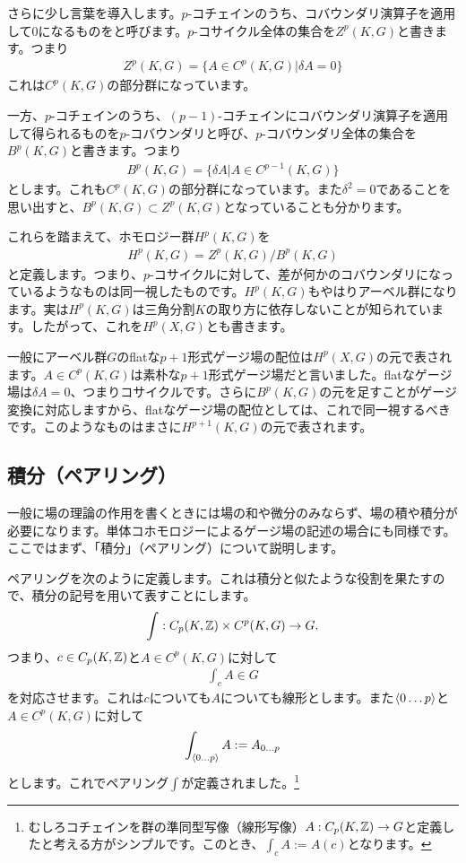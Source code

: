 \documentclass[generalized_symmetry.tex]{subfiles}
\begin{document}
さらに少し言葉を導入します。$p$-コチェインのうち、コバウンダリ演算子を適用して$0$になるものをと呼びます。$p$-コサイクル全体の集合を$Z^p(K,G)$と書きます。つまり
\begin{align}
    Z^p(K,G) = \{A\in C^p(K,G) | \delta A = 0\}
\end{align}
これは$C^p(K,G)$の部分群になっています。

一方、$p$-コチェインのうち、$(p-1)$-コチェインにコバウンダリ演算子を適用して得られるものを$p$-コバウンダリと呼び、$p$-コバウンダリ全体の集合を$B^p(K,G)$と書きます。つまり
\begin{align}
    B^p(K,G) = \{\delta A | A\in C^{p-1}(K,G)\}
\end{align}
とします。これも$C^p(K,G)$の部分群になっています。また$\delta^2=0$であることを思い出すと、$B^p(K,G)\subset Z^p(K,G)$となっていることも分かります。

これらを踏まえて、ホモロジー群$H^p(K,G)$を
\begin{align}
    H^p(K,G) = Z^p(K,G)/B^p(K,G)
\end{align}
と定義します。つまり、$p$-コサイクルに対して、差が何かのコバウンダリになっているようなものは同一視したものです。$H^p(K,G)$もやはりアーベル群になります。実は$H^p(K,G)$は三角分割$K$の取り方に依存しないことが知られています。したがって、これを$H^p(X,G)$とも書きます。

一般にアーベル群$G$のflatな$p+1$形式ゲージ場の配位は$H^p(X,G)$の元で表されます。$A \in C^{p}(K,G)$は素朴な$p+1$形式ゲージ場だと言いました。flatなゲージ場は$\delta A=0$、つまりコサイクルです。さらに$B^p(K,G)$の元を足すことがゲージ変換に対応しますから、flatなゲージ場の配位としては、これで同一視するべきです。このようなものはまさに$H^{p+1}(K,G)$の元で表されます。

\subsection{積分（ペアリング）}

一般に場の理論の作用を書くときには場の和や微分のみならず、場の積や積分が必要になります。単体コホモロジーによるゲージ場の記述の場合にも同様です。ここではまず、「積分」（ペアリング）について説明します。

ペアリングを次のように定義します。これは積分と似たような役割を果たすので、積分の記号を用いて表すことにします。
\begin{align}
    \int : C_p(K,\mathbb{Z}) \times C^p(K,G) \to G.
\end{align}
つまり、$c \in C_p(K,\mathbb{Z})$と$A \in C^p(K,G)$に対して
\begin{align}
    \int_c A \in G
\end{align}
を対応させます。これは$c$についても$A$についても線形とします。また$\expval{0\dots p}$と$A \in C^p(K,G)$に対して
\begin{align}
    \int_{\expval{0\dots p}} A := A_{0\dots p}
\end{align}
とします。これでペアリング$\int$が定義されました。\footnote{むしろコチェインを群の準同型写像（線形写像）$A:C_{p}(K,\mathbb{Z})\to G$と定義したと考える方がシンプルです。このとき、$\int_c A := A(c)$となります。}
\end{document}
